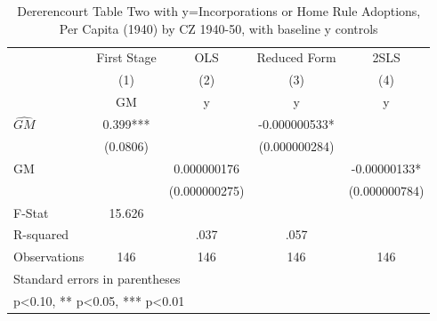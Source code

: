 \begin{table}[htbp]\centering
\def\sym#1{\ifmmode^{#1}\else\(^{#1}\)\fi}
\caption{Dererencourt Table Two with y=Incorporations or Home Rule Adoptions, Per Capita (1940) by CZ 1940-50, with baseline y controls}
\begin{tabular}{l*{4}{c}}
\toprule
                    & First Stage   &         OLS   &Reduced Form   &        2SLS   \\
                    &\multicolumn{1}{c}{(1)}&\multicolumn{1}{c}{(2)}&\multicolumn{1}{c}{(3)}&\multicolumn{1}{c}{(4)}\\
                    &\multicolumn{1}{c}{GM}&\multicolumn{1}{c}{y}&\multicolumn{1}{c}{y}&\multicolumn{1}{c}{y}\\
\midrule
$\hat{GM}$          &       0.399***&               &-0.000000533*  &               \\
                    &    (0.0806)   &               &(0.000000284)   &               \\
\addlinespace
GM                  &               & 0.000000176   &               & -0.00000133*  \\
                    &               &(0.000000275)   &               &(0.000000784)   \\
\midrule
F-Stat              &      15.626   &               &               &               \\
R-squared           &               &        .037   &        .057   &               \\
Observations        &         146   &         146   &         146   &         146   \\
\bottomrule
\multicolumn{5}{l}{\footnotesize Standard errors in parentheses}\\
\multicolumn{5}{l}{\footnotesize * p<0.10, ** p<0.05, *** p<0.01}\\
\end{tabular}
\end{table}
